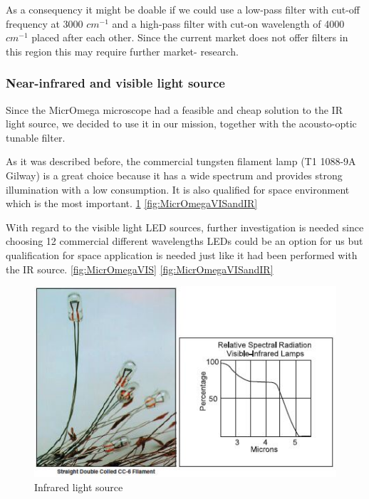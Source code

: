As a consequency it might be doable if we could use a low-pass filter with cut-off frequency at 3000 $cm^{-1}$ and a high-pass filter with cut-on wavelength of 4000 $cm^{-1}$ placed after each other. Since the current market does not offer filters in this region this may require further market- research.

\subsubsection{Near-infrared and visible light source}

Since the MicrOmega microscope had a feasible and cheap solution to the IR light source, we decided to use it in our mission, together with the acousto-optic tunable filter. 

As it was described before, the commercial tungsten filament lamp (T1 1088-9A Gilway) is a great choice because it has a wide spectrum and provides strong illumination with a low consumption. It is also qualified for space environment which is the most important.
\ref{fig:IR_light_source}
\ref{fig:MicrOmegaVISandIR}

With regard to the visible light LED sources, further investigation is needed since choosing 12 commercial different wavelengths LEDs  could be an option for us but qualification for space application is needed just like it had been performed with the IR source.
\ref{fig:MicrOmegaVIS}
\ref{fig:MicrOmegaVISandIR}

\begin{figure}[htb]
  \centering
  \includegraphics[scale=0.6]{figures/BFfig/IR_light_source}
  \caption{Infrared light source \cite{halogenlamp}}
  \label{fig:IR_light_source}
\end{figure}


